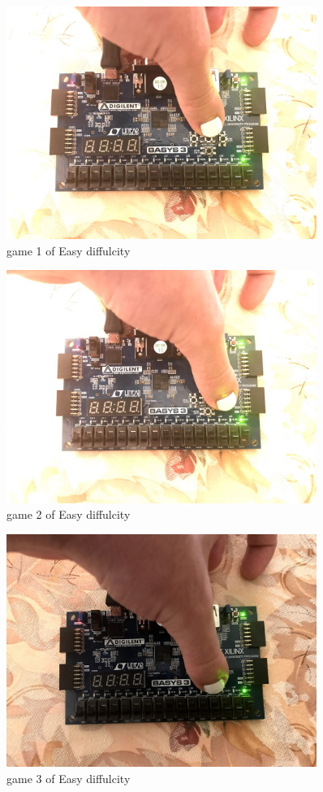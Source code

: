 \documentclass[11pt]{article}
\begin{document}
\begin{figure}
	\includegraphics[width=0.9\textwidth]{IMG_1311.jpg}
	\caption{game 1 of Easy diffulcity }
	\label{fig:sim_with_table}
\end{figure}
\begin{figure}
	\includegraphics[width=0.9\textwidth]{IMG_1312.jpg}
	\caption{game 2 of Easy diffulcity }
	\label{fig:sim_with_table}
\end{figure}
\begin{figure}
	\includegraphics[width=0.9\textwidth]{IMG_1313.jpg}
	\caption{game 3 of Easy diffulcity }
	\label{fig:sim_with_table}
\end{figure}
\end{document}
